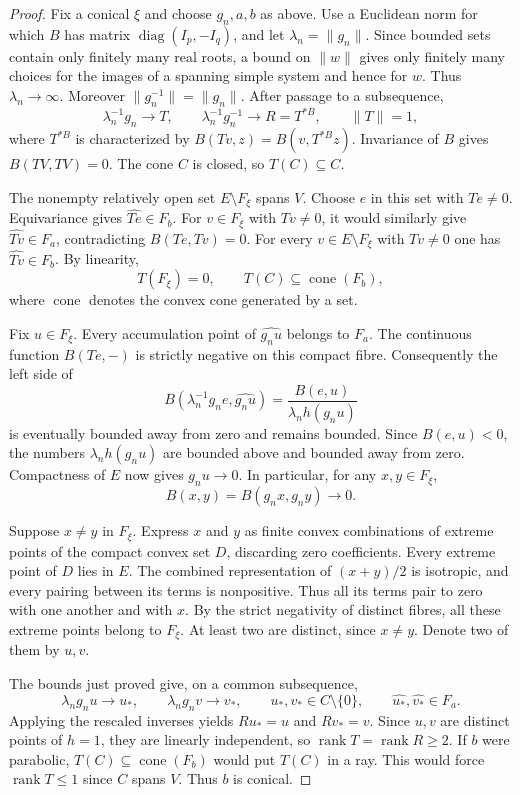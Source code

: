 \documentclass[11pt,reqno]{amsart}
\theoremstyle{plain}
\theoremstyle{definition}
\theoremstyle{remark}
\numberwithin{equation}{section}
\begin{document}
\begin{proof}
Fix a conical $\xi$ and choose $g_n,a,b$ as above. Use a Euclidean norm
for which $B$ has matrix $\operatorname{diag}(I_p,-I_q)$, and let
$\lambda_n=\lVert g_n\rVert$. Since bounded sets contain only finitely
many real roots, a bound on $\lVert w\rVert$ gives only finitely many
choices for the images of a spanning simple system and hence for $w$.
Thus $\lambda_n\to\infty$. Moreover
$\lVert g_n^{-1}\rVert=\lVert g_n\rVert$. After passage to a subsequence,
\[
 \lambda_n^{-1}g_n\longrightarrow T,\qquad
 \lambda_n^{-1}g_n^{-1}\longrightarrow R=T^{*B},
 \qquad \lVert T\rVert=1,
\]
where $T^{*B}$ is characterized by $B(Tv,z)=B(v,T^{*B}z)$.
Invariance of $B$ gives $B(TV,TV)=0$. The cone $C$ is closed, so
$T(C)\subseteq C$.

The nonempty relatively open set $E\setminus F_\xi$ spans $V$.
Choose $e$ in this set with $Te\ne0$. Equivariance gives
$\widehat{Te}\in F_b$. For $v\in F_\xi$ with $Tv\ne0$, it would
similarly give $\widehat{Tv}\in F_a$, contradicting $B(Te,Tv)=0$.
For every $v\in E\setminus F_\xi$ with $Tv\ne0$ one has
$\widehat{Tv}\in F_b$. By linearity,
\[
 T(F_\xi)=0,\qquad T(C)\subseteq\operatorname{cone}(F_b),
\]
where $\operatorname{cone}$ denotes the convex cone generated by a set.

Fix $u\in F_\xi$. Every accumulation point of $\widehat{g_nu}$ belongs
to $F_a$. The continuous function $B(Te,-)$ is strictly negative on
this compact fibre. Consequently the left side of
\[
 B\!\left(\lambda_n^{-1}g_ne,\widehat{g_nu}\right)
       =\frac{B(e,u)}{\lambda_n h(g_nu)}
\]
is eventually bounded away from zero and remains bounded.
Since $B(e,u)<0$, the numbers $\lambda_n h(g_nu)$ are bounded above
and bounded away from zero. Compactness of $E$ now gives $g_nu\to0$.
In particular, for any $x,y\in F_\xi$,
\[
 B(x,y)=B(g_nx,g_ny)\longrightarrow0.
\]

Suppose $x\ne y$ in $F_\xi$. Express $x$ and $y$ as finite convex
combinations of extreme points of the compact convex set $D$,
discarding zero coefficients. Every extreme point of $D$ lies in $E$.
The combined representation of $(x+y)/2$ is isotropic, and every
pairing between its terms is nonpositive. Thus all its terms pair
to zero with one another and with $x$. By the strict negativity of
distinct fibres, all these extreme points belong to $F_\xi$.
At least two are distinct, since $x\ne y$. Denote two of them by $u,v$.

The bounds just proved give, on a common subsequence,
\[
 \lambda_n g_nu\to u_*,\qquad \lambda_n g_nv\to v_*,
 \qquad u_*,v_*\in C\setminus\{0\},\qquad
 \widehat{u_*},\widehat{v_*}\in F_a.
\]
Applying the rescaled inverses yields $Ru_*=u$ and $Rv_*=v$. Since
$u,v$ are distinct points of $h=1$, they are linearly independent,
so $\operatorname{rank}T=\operatorname{rank}R\geq2$.
If $b$ were parabolic, $T(C)\subseteq\operatorname{cone}(F_b)$ would
put $T(C)$ in a ray. This would force $\operatorname{rank}T\leq1$
since $C$ spans $V$. Thus $b$ is conical.


\end{proof}
\end{document}
